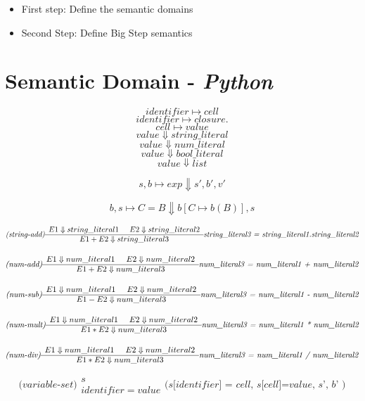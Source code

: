 \documentclass{llncs}
\newcommand{\pfrule}[2]{\begin{array}{c} #1 \\ \hline #2 \end{array}}
\begin{document}
\begin{itemize}
  \item First step: Define the semantic domains
  \item Second Step: Define Big Step semantics
\end{itemize}




\section{Semantic Domain - \textit{Python}}

$$identifier \mapsto cell$$
$$identifier \mapsto closure. $$
$$cell \mapsto value$$
$$value \Downarrow string\_literal$$
$$value \Downarrow num\_literal$$
$$value \Downarrow bool\_literal$$
$$value \Downarrow list$$


$$s, b \mapsto exp \Downarrow  s', b', v'$$



$$b,s \mapsto C=B \Downarrow b[C\mapsto b(B)],s$$

$$
\textit{(string-add)}
\pfrule
{E1 \Downarrow string\_literal1 \hspace{5 mm} E2 \Downarrow string\_literal2}
{E1+E2 \Downarrow string\_literal3}
\textit{string\_literal3 = string\_literal1.string\_literal2}
$$



$$
\textit{(num-add)}
\pfrule
{E1 \Downarrow num\_literal1 \hspace{5 mm} E2 \Downarrow num\_literal2}
{E1+E2 \Downarrow num\_literal3}
\textit{num\_literal3 = num\_literal1 + num\_literal2}
$$

$$
\textit{(num-sub)}
\pfrule
{E1 \Downarrow num\_literal1 \hspace{5 mm} E2 \Downarrow num\_literal2}
{E1-E2 \Downarrow num\_literal3}
\textit{num\_literal3 = num\_literal1 - num\_literal2}
$$

$$
\textit{(num-mult)}
\pfrule
{E1 \Downarrow num\_literal1 \hspace{5 mm} E2 \Downarrow num\_literal2}
{E1 * E2 \Downarrow num\_literal3}
\textit{num\_literal3 = num\_literal1 * num\_literal2}
$$


$$
\textit{(num-div)}
\pfrule
{E1 \Downarrow num\_literal1 \hspace{5 mm} E2 \Downarrow num\_literal2}
{E1 * E2 \Downarrow num\_literal3}
\textit{num\_literal3 = num\_literal1 / num\_literal2}
$$

$$
\textit{(variable-set)}
\pfrule
{s}
{identifier = value}
{\textit{(s[identifier] = cell, s[cell]=value,  s', b' )}}
$$
\end{document}
